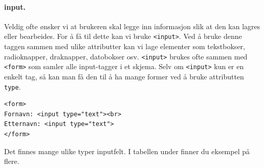 \documentclass[%
oneside,                 %
final,                   %
12pt]{article}
\newenvironment{notice_mdfboxadmon}[1][]{
\begin{notice_mdfboxmdframed}[frametitle=#1]
}
{
\end{notice_mdfboxmdframed}
}
\begin{document}
\paragraph{input.}

Veldig ofte ønsker vi at brukeren skal legge inn informasjon slik at
den kan lagres eller bearbeides. For å få til dette kan vi bruke
\texttt{<input>}. Ved å bruke denne taggen sammen med ulike attributter kan vi
lage elementer som tekstbokser, radioknapper, draknapper, datobokser
osv. \texttt{<input>} brukes ofte sammen med \texttt{<form>} som samler alle
input-tagger i et skjema. Selv om \texttt{<input>} kun er en enkelt tag, så
kan man få den til å ha mange former ved å bruke attributten \texttt{type}.


\begin{notice_mdfboxadmon}
\begin{verbatim}
<form>
Fornavn: <input type="text"><br>
Etternavn: <input type="text">
</form>
\end{verbatim}
\end{notice_mdfboxadmon}



Det finnes mange ulike typer inputfelt. I tabellen under finner du
eksempel på flere.
\end{document}
